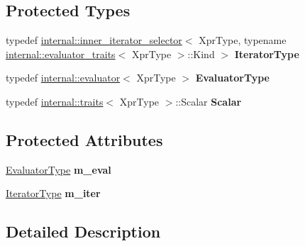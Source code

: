 \subsection*{Protected Types}
\begin{DoxyCompactItemize}
\item 
\mbox{\label{class_eigen_1_1_inner_iterator_ab25148ad4830f58644c537eb122fd966}} 
typedef \mbox{\hyperlink{class_eigen_1_1internal_1_1inner__iterator__selector}{internal\+::inner\+\_\+iterator\+\_\+selector}}$<$ Xpr\+Type, typename \mbox{\hyperlink{struct_eigen_1_1internal_1_1evaluator__traits}{internal\+::evaluator\+\_\+traits}}$<$ Xpr\+Type $>$\+::Kind $>$ {\bfseries Iterator\+Type}
\item 
\mbox{\label{class_eigen_1_1_inner_iterator_a1eeeda4c6c2ff90408f7b92890b29820}} 
typedef \mbox{\hyperlink{struct_eigen_1_1internal_1_1evaluator}{internal\+::evaluator}}$<$ Xpr\+Type $>$ {\bfseries Evaluator\+Type}
\item 
\mbox{\label{class_eigen_1_1_inner_iterator_ae1bfa486ca2ead3a5a78118b5d990d91}} 
typedef \mbox{\hyperlink{struct_eigen_1_1internal_1_1traits}{internal\+::traits}}$<$ Xpr\+Type $>$\+::Scalar {\bfseries Scalar}
\end{DoxyCompactItemize}
\subsection*{Protected Attributes}
\begin{DoxyCompactItemize}
\item 
\mbox{\label{class_eigen_1_1_inner_iterator_a4c7ff45e97e696ee53a6c05dcae2fc57}} 
\mbox{\hyperlink{struct_eigen_1_1internal_1_1evaluator}{Evaluator\+Type}} {\bfseries m\+\_\+eval}
\item 
\mbox{\label{class_eigen_1_1_inner_iterator_aa7ebd0701b3c10e76a5fc476e7b9f7ae}} 
\mbox{\hyperlink{class_eigen_1_1internal_1_1inner__iterator__selector}{Iterator\+Type}} {\bfseries m\+\_\+iter}
\end{DoxyCompactItemize}


\subsection{Detailed Description}
